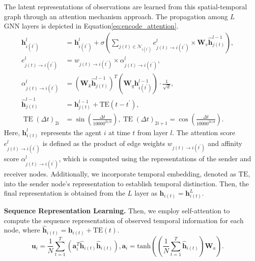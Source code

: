 The latent representations of observations are learned from this spatial-temporal graph through an attention mechanism approach. The propagation among $L$ GNN layers is depicted in Equation\eqref{eq:encode_attention}.
\begin{align}\label{eq:encode_attention}
\bm{h}_{i\left(t^{\prime}\right)}^l&=\bm{h}_{i\left(t^{\prime}\right)}^l+\sigma\left(\sum_{j(t) \in \mathcal{N}_{i\left(t^{\prime}\right)}} e_{j(t) \rightarrow i\left(t^{\prime}\right)}^l \times \bm{W}_v \hat{\bm{h}}_{j(t)}^{l-1}\right),\nonumber \\
e_{j(t) \rightarrow i\left(t^{\prime}\right)}^l&=w_{j(t) \rightarrow i\left(t^{\prime}\right)} \times \alpha_{j(t) \rightarrow i\left(t^{\prime}\right)}^l, \nonumber \\ 
\alpha_{j(t) \rightarrow i\left(t^{\prime}\right)}^l&=\left(\bm{W}_k \hat{\bm{h}}_{j(t)}^{l-1}\right)^T\left(\bm{W}_q \bm{h}_{i\left(t^{\prime}\right)}^{l-1}\right) \cdot \frac{1}{\sqrt{d}}, \\ 
\hat{\bm{h}}_{j(t)}^{l-1}&=\bm{h}_{j(t)}^{l-1}+\mathrm{TE}\left(t-t^{\prime}\right), \nonumber \\ 
\operatorname{TE}(\Delta t)_{2 i}&=\sin \left(\frac{\Delta t}{10000^{2 i / d}}\right), \operatorname{TE}(\Delta t)_{2 i+1}=\cos \left(\frac{\Delta t}{10000^{2 i / d}}\right).  \nonumber   
\end{align}
Here, $\bm{h}_{i(t)}^{l}$ represents the agent $i$ at time $t$ from layer $l$. The attention score $e_{j(t) \rightarrow i\left(t^{\prime}\right)}^l$ is defined as the product of edge weights $w_{j(t) \rightarrow i\left(t^{\prime}\right)}$ and affinity score $\alpha_{j(t) \rightarrow i\left(t^{\prime}\right)}^l$, which is computed using the representations of the sender and receiver nodes. Additionally, we incorporate temporal embedding, denoted as $\mathrm{TE}$, into the sender node's representation to establish temporal distinction. Then, the final representation is obtained from the $L$ layer as $\bm{h}_{i(t)} = \bm{h}^L_{i(t)}$.

\textbf{Sequence Representation Learning.} Then, we employ self-attention to compute the sequence representation of observed temporal information for each node, where $\hat{\bm{h}}_{i(t)} = \bm{h}_{i(t)} + \text{TE}(t)$.
\begin{equation}
    \bm{u}_i = \frac{1}{N} \sum_{t=1}^T (\bm{a}_i^T \hat{\bm{h}}_{i(t)} \hat{\bm{h}}_{i(t)}), \bm{a}_i = \text{tanh}\left(\left(\frac{1}{N} \sum_{t=1}^T \hat{\bm{h}}_{i(t)}  \right)\bm{W}_a\right).
\end{equation}

